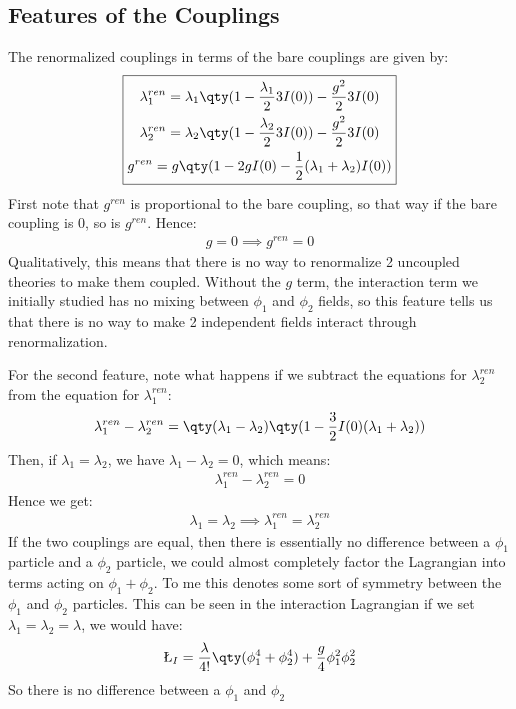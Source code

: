 \documentclass[12pt]{article}
\begin{document}
\subsection{Features of the Couplings}
The renormalized couplings in terms of the bare couplings are given by:
\begin{equation}
  \boxed{\begin{gathered}
    \lambda_1^{ren}=\lambda_1\qty(1-\frac{\lambda_1}23I(0))-\frac{g^2}23I(0)\\
    \lambda_2^{ren}=\lambda_2\qty(1-\frac{\lambda_2}23I(0))-\frac{g^2}23I(0)\\
    g^{ren}=g\qty(1-2gI(0)-\frac12(\lambda_1+\lambda_2)I(0))
  \end{gathered}}
\end{equation}
First note that $g^{ren}$ is proportional to the bare coupling, so that way if the bare coupling is $0$, so is $g^{ren}$. Hence:
\begin{align*}
  g=0\implies g^{ren}=0
\end{align*}
Qualitatively, this means that there is no way to renormalize 2 uncoupled theories to make them coupled. Without the $g$ term, the interaction term we initially studied has no mixing between $\phi_1$ and $\phi_2$ fields, so this feature tells us that there is no way to make 2 independent fields interact through renormalization.

For the second feature, note what happens if we subtract the equations for $\lambda_2^{ren}$ from the equation for $\lambda_1^{ren}$:
\begin{align*}
  \lambda_1^{ren}-\lambda_2^{ren}=\qty(\lambda_1-\lambda_2)
  \qty(1-\frac32I(0)(\lambda_1+\lambda_2))
\end{align*}
Then, if $\lambda_1=\lambda_2$, we have $\lambda_1-\lambda_2=0$, which means:
\begin{align*}
  \lambda_1^{ren}-\lambda_2^{ren}=0
\end{align*}
Hence we get:
\begin{align*}
  \lambda_1=\lambda_2\implies\lambda_1^{ren}=\lambda_2^{ren}
\end{align*}
If the two couplings are equal, then there is essentially no difference between a $\phi_1$ particle and a $\phi_2$ particle, we could almost completely factor the Lagrangian into terms acting on $\phi_1+\phi_2$. To me this denotes some sort of symmetry between the $\phi_1$ and $\phi_2$ particles. This can be seen in the interaction Lagrangian if we set $\lambda_1=\lambda_2=\lambda$, we would have:
\begin{align*}
  \L_I=\frac{\lambda}{4!}\qty(\phi_1^4+\phi_2^4)+\frac{g}4\phi_1^2\phi_2^2
\end{align*}
So there is no difference between a $\phi_1$ and $\phi_2$
\end{document}
